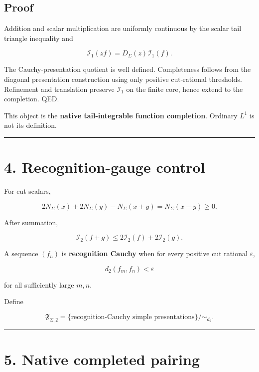 \hypertarget{proof}{%
\subsection{Proof}\label{proof}}

Addition and scalar multiplication are uniformly continuous by the scalar tail
triangle inequality and

\[
\mathcal I_1(zf)
=D_\Sigma(z)\mathcal I_1(f).
\]

The Cauchy-presentation quotient is well defined. Completeness follows from the
diagonal presentation construction using only positive cut-rational thresholds.
Refinement and translation preserve \(\mathcal I_1\) on the finite core, hence
extend to the completion. QED.

This object is the \textbf{native tail-integrable function completion}. Ordinary
\(L^1\) is not its definition.

\begin{center}\rule{0.5\linewidth}{0.5pt}\end{center}

\hypertarget{recognition-gauge-control}{%
\section{4. Recognition-gauge control}\label{recognition-gauge-control}}

For cut scalars,

\[
2N_\Sigma(x)+2N_\Sigma(y)-N_\Sigma(x+y)
=N_\Sigma(x-y)\ge0.
\tag{4.1}
\]

After summation,

\[
\boxed{
\mathcal I_2(f+g)
\le
2\mathcal I_2(f)+2\mathcal I_2(g).
}
\tag{4.2}
\]

A sequence \((f_n)\) is \textbf{recognition Cauchy} when for every positive cut
rational \(\varepsilon\),

\[
d_2(f_m,f_n)<\varepsilon
\]

for all sufficiently large \(m,n\).

Define

\[
\boxed{
\mathfrak F_{\Sigma,2}
=
\{\text{recognition-Cauchy simple presentations}\}/\sim_{d_2}.
}
\tag{4.3}
\]

\begin{center}\rule{0.5\linewidth}{0.5pt}\end{center}

\hypertarget{native-completed-pairing}{%
\section{5. Native completed pairing}\label{native-completed-pairing}}


